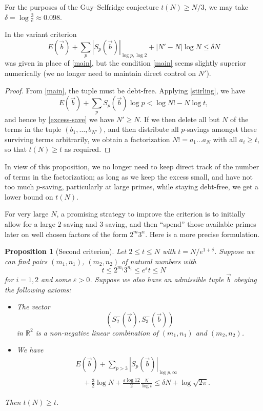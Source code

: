 \documentclass[12pt,a4paper,reqno]{amsart}
\numberwithin{equation}{section}
\theoremstyle{plain}
\newtheorem{proposition}[theorem]{Proposition}
\theoremstyle{definition}
\newcommand\R{\mathbb{R}}
\newcommand\eps{\varepsilon}
\begin{document}
For the purposes of the Guy--Selfridge conjecture $t(N) \geq N/3$, we may take $\delta = \log \frac{3}{e} \approx 0.098$.  

In \cite[Proposition 3.1]{tao} the variant criterion
$$ 
E(\vec b)  + \sum_p |S_p(\vec b)|_{\log p,\log 2} + |N'-N| \log N \leq \delta N$$
was given in place of \eqref{main}, but the condition \eqref{main} seems slightly superior numerically (we no longer need to maintain direct control on $N'$).

\begin{proof}  From \eqref{main}, the tuple must be debt-free.  Applying \eqref{stirling}, we have
$$ E(\vec b) + \sum_p S_p(\vec b) \log p < \log N! - N\log t,$$
and hence by \eqref{excess-save} we have $N' \geq N$.
If we then delete all but $N$ of the terms in the tuple $(b_1,\dots,b_{N'})$, and then distribute all $p$-savings amongst these surviving terms arbitrarily, we obtain a factorization $N! = a_1 \dots a_N$ with all $a_i \geq t$, so that $t(N) \geq t$ as required.
\end{proof}

In view of this proposition, we no longer need to keep direct track of the number of terms in the factorization; as long as we keep the excess small, and have not too much $p$-saving, particularly at large primes, while staying debt-free, we get a lower bound on $t(N)$. 

For very large $N$, a promising strategy to improve the criterion is to initially allow for a large $2$-saving and $3$-saving, and then ``spend'' those available primes later on well chosen factors of the form $2^m 3^n$.  Here is a more precise formulation.

\begin{proposition}[Second criterion]  Let $2 \leq t \leq N$ with $t = N /e^{1+\delta}$.  Suppose we can find pairs $(m_1,n_1)$, $(m_2,n_2)$ of natural numbers with
\begin{equation}\label{atet}
   t \leq 2^{m_i} 3^{n_i} \leq e^\eps t \leq N
\end{equation}
for $i=1,2$ and some $\eps>0$.  Suppose we also have an admissible tuple $\vec b$ obeying the following axioms:
\begin{itemize}
  \item[(i)]  The vector
\begin{equation}\label{svec}
  (S^-_2(\vec b), S^-_3(\vec b))
\end{equation}
in $\R^2$ is a non-negative linear combination of $(m_1,n_1)$ and $(m_2,n_2)$.
  \item[(ii)]  We have
  \begin{equation}\label{main-2}
    \begin{split} 
&    E(\vec b) + \sum_{p>3} |S_p(\vec b)|_{\log p,\infty} \\
& \quad + \frac{3}{2} \log N + \frac{\eps \log 12}{2} \frac{N}{\log t} \leq \delta N + \log \sqrt{2\pi}.
    \end{split}
  \end{equation}
\end{itemize}
Then $t(N) \geq t$.
\end{proposition}
\end{document}
